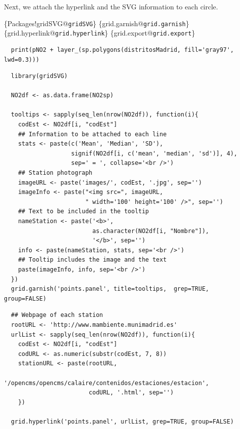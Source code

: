 Next, we attach the hyperlink and the SVG information to each
circle.


\begin{LaTeX}
\index\{Packages!gridSVG@\texttt{gridSVG}\}
\index\{grid.garnish@\texttt{grid.garnish}\}
\index\{grid.hyperlink@\texttt{grid.hyperlink}\}
\index\{grid.export@\texttt{grid.export}\}
\end{LaTeX}

\lstset{language=r,label= ,caption= ,captionpos=b,numbers=none}
\begin{lstlisting}
  print(pNO2 + layer_(sp.polygons(distritosMadrid, fill='gray97', lwd=0.3)))
\end{lstlisting}

\lstset{language=r,label= ,caption= ,captionpos=b,numbers=none}
\begin{lstlisting}
  library(gridSVG)
  
  NO2df <- as.data.frame(NO2sp)
  
  tooltips <- sapply(seq_len(nrow(NO2df)), function(i){
    codEst <- NO2df[i, "codEst"]
    ## Information to be attached to each line
    stats <- paste(c('Mean', 'Median', 'SD'),
                   signif(NO2df[i, c('mean', 'median', 'sd')], 4),
                   sep=' = ', collapse='<br />')
    ## Station photograph 
    imageURL <- paste('images/', codEst, '.jpg', sep='')
    imageInfo <- paste("<img src=", imageURL,
                       " width='100' height='100' />", sep='')
    ## Text to be included in the tooltip
    nameStation <- paste('<b>', 
                         as.character(NO2df[i, "Nombre"]),
                         '</b>', sep='')
    info <- paste(nameStation, stats, sep='<br />')
    ## Tooltip includes the image and the text
    paste(imageInfo, info, sep='<br />')
  })
  grid.garnish('points.panel', title=tooltips,  grep=TRUE, group=FALSE)
\end{lstlisting}


\lstset{language=r,label= ,caption= ,captionpos=b,numbers=none}
\begin{lstlisting}
  ## Webpage of each station
  rootURL <- 'http://www.mambiente.munimadrid.es'
  urlList <- sapply(seq_len(nrow(NO2df)), function(i){
    codEst <- NO2df[i, "codEst"]
    codURL <- as.numeric(substr(codEst, 7, 8))
    stationURL <- paste(rootURL,
                        '/opencms/opencms/calaire/contenidos/estaciones/estacion',
                        codURL, '.html', sep='')
    })
  
  grid.hyperlink('points.panel', urlList, grep=TRUE, group=FALSE)
\end{lstlisting}

